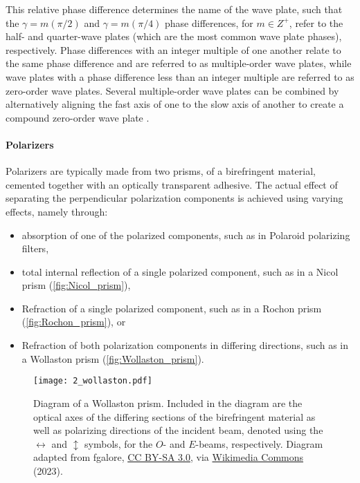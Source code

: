 This relative phase difference determines the name of the wave plate, such that the $\gamma = m(\pi/2) $ and $\gamma = m(\pi/4)$ phase differences, for $m \in Z^{+}$, refer to the half- and quarter-wave plates (which are the most common wave plate phases), respectively.
Phase differences with an integer multiple of one another relate to the same phase difference and are referred to as multiple-order wave plates, while wave plates with a phase difference less than an integer multiple are referred to as zero-order wave plates.
Several multiple-order wave plates can be combined by alternatively aligning the fast axis of one to the slow axis of another to create a compound zero-order wave plate \citep{Hale_birefringence}.

\pagebreak

\paragraph{Polarizers} \label{par:polarizer}
Polarizers are typically made from two prisms, of a birefringent material, cemented together with an optically transparent adhesive.
The actual effect of separating the perpendicular polarization components is achieved using varying effects, namely through:
\begin{itemize}
    \item absorption of one of the polarized components, such as in Polaroid polarizing filters,
    \item total internal reflection of a single polarized component, such as in a Nicol prism (\autoref{fig:Nicol_prism}),
    \item Refraction of a single polarized component, such as in a Rochon prism (\autoref{fig:Rochon_prism}), or
    \item Refraction of both polarization components in differing directions, such as in a Wollaston prism (\autoref{fig:Wollaston_prism}).
\end{itemize}

\begin{figure}[t]
    \centering
    \texttt{[image: 2\_wollaston.pdf]}
    \caption{
        Diagram of a Wollaston prism.
        Included in the diagram are the optical axes of the differing sections of the birefringent material as well as polarizing directions of the incident beam, denoted using the $\leftrightarrow$ and $\updownarrow$ symbols, for the $O$- and $E$-beams, respectively.
        Diagram adapted from fgalore, \protect\href{https://creativecommons.org/licenses/by-sa/3.0/}{CC BY-SA 3.0}, via \protect\href{https://commons.wikimedia.org/wiki/File:Wollaston-prism.svg}{Wikimedia Commons} (2023).
    }
    \label{fig:Wollaston_prism}
\end{figure}

